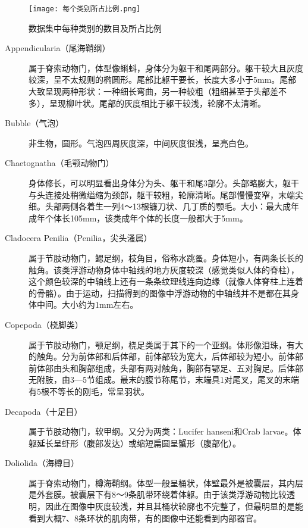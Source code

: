 \begin{figure}[!ht]
\centering
\texttt{[image: 每个类别所占比例.png]}
\caption{数据集中每种类别的数目及所占比例}
\label{fig: ratio}
\end{figure} 

\begin{description}
    \item[Appendicularia（尾海鞘纲）] 属于脊索动物门，体型像蝌蚪，身体分为躯干和尾两部分。躯干较大且灰度较深，呈不太规则的椭圆形。尾部比躯干要长，长度大多小于5mm。尾部大致呈现两种形状：一种细长弯曲，另一种较粗（粗细甚至于头部差不多），呈现柳叶状。尾部的灰度相比于躯干较浅，轮廓不太清晰。

    \item[Bubble（气泡）] 非生物，圆形。气泡四周灰度深，中间灰度很浅，呈亮白色。

    \item[Chaetognatha（毛颚动物门）] 身体修长，可以明显看出身体分为头、躯干和尾3部分。头部略膨大，躯干与头连接处稍微缢缩为颈部，躯干较粗，轮廓清晰。尾部慢慢变窄，末端尖细。头部两侧各着生一列4～13根镰刀状、几丁质的颚毛。大小：最大成年成年个体长105mm，该类成年个体的长度一般都大于5mm。

    \item[Cladocera Penilia（Penilia，尖头溞属）] 属于节肢动物门，鳃足纲，枝角目，俗称水跳蚤。身体短小，有两条长长的触角。该类浮游动物身体中轴线的地方灰度较深（感觉类似人体的脊柱），这个颜色较深的中轴线上还有一条条纹理线连向边缘（就像人体脊柱上连着的骨骼）。由于运动，扫描得到的图像中浮游动物的中轴线并不是都在其身体中间。大小约为1mm左右。
    
    \item[Copepoda（桡脚类）] 属于节肢动物门，颚足纲，桡足类属于其下的一个亚纲。体形像泪珠，有大的触角。分为前体部和后体部，前体部较为宽大，后体部较为短小。前体部前体部由头和胸部组成，头部有两对触角，胸部有鄂足、五对胸足。后体部无附肢，由3—5节组成。最末的腹节称尾节，末端具1对尾叉，尾叉的末端有5根不等长的刚毛，常呈羽状。    
    
    \item[Decapoda（十足目）] 属于节肢动物门，软甲纲。又分为两类：Lucifer hanseni和Crab larvae。体躯延长呈虾形（腹部发达）或缩短扁圆呈蟹形（腹部化）。

    \item[Doliolida（海樽目）] 属于脊索动物门，樽海鞘纲。体型一般呈桶状，体壁最外是被囊层，其内层是外套膜。被囊层下有8～9条肌带环绕着体躯。由于该类浮游动物比较透明，因此在图像中灰度较浅，并且其桶状轮廓也不完整了，但最明显的是能看到大概7、8条环状的肌肉带，有的图像中还能看到内部器官。


\end{description}
